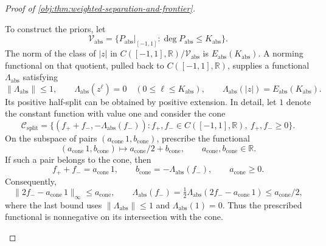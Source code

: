 \begin{proof}[Proof of \cref{obj:thm:weighted-separation-and-frontier}]
\begin{enumerate}
To construct the priors, let
\[
\mathcal V_{\mathrm{abs}}
=\{P_{\mathrm{abs}}|_{[-1,1]}:\deg P_{\mathrm{abs}}\le K_{\mathrm{abs}}\}.
\]
The norm of the class of \(|z|\) in
\(C([-1,1],\mathbb R)/\mathcal V_{\mathrm{abs}}\) is
\(E_{\mathrm{abs}}(K_{\mathrm{abs}})\). A norming functional on that quotient, pulled back to \(C([-1,1],\mathbb R)\), supplies a functional
\(\Lambda_{\mathrm{abs}}\) satisfying
\[
\|\Lambda_{\mathrm{abs}}\|\le1,
\qquad
\Lambda_{\mathrm{abs}}(z^\ell)=0
\quad(0\le\ell\le K_{\mathrm{abs}}),
\qquad
\Lambda_{\mathrm{abs}}(|z|)=E_{\mathrm{abs}}(K_{\mathrm{abs}}).
\]
Its positive half-split can be obtained by positive extension. In detail, let \(1\) denote the constant function with value one and consider the cone
\[
\mathcal C_{\mathrm{split}}
=\{(f_++f_-,-\Lambda_{\mathrm{abs}}(f_-)):
 f_+,f_-\in C([-1,1],\mathbb R),\ f_+,f_-\ge0\}.
\]
On the subspace of pairs \((a_{\mathrm{cone}}\,1,b_{\mathrm{cone}})\), prescribe the functional
\[
(a_{\mathrm{cone}}\,1,b_{\mathrm{cone}})
\longmapsto a_{\mathrm{cone}}/2+b_{\mathrm{cone}},
\qquad a_{\mathrm{cone}},b_{\mathrm{cone}}\in\mathbb R.
\]
If such a pair belongs to the cone, then
\[
f_++f_-=a_{\mathrm{cone}}\,1,
\qquad
b_{\mathrm{cone}}=-\Lambda_{\mathrm{abs}}(f_-),
\qquad a_{\mathrm{cone}}\ge0.
\]
Consequently,
\[
\|2f_--a_{\mathrm{cone}}\,1\|_\infty\le a_{\mathrm{cone}},
\qquad
\Lambda_{\mathrm{abs}}(f_-)
=\tfrac12\Lambda_{\mathrm{abs}}(2f_--a_{\mathrm{cone}}\,1)
\le a_{\mathrm{cone}}/2,
\]
where the last bound uses \(\|\Lambda_{\mathrm{abs}}\|\le1\) and
\(\Lambda_{\mathrm{abs}}(1)=0\). Thus the prescribed functional is nonnegative on its intersection with the cone.


\end{enumerate}
\end{proof}
